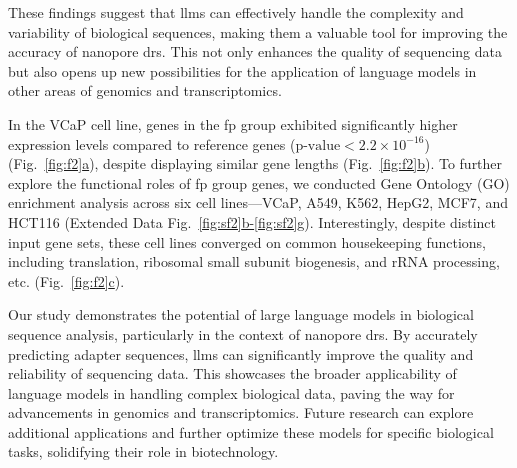 \documentclass[pdflatex, sn-mathphys-num, lineno]{sn-jnl}%
\newcommand{\figref}[2]{Fig.~\hyperref[#1]{\ref*{#1}#2}}
\newcommand{\edfigrefrg}[3]{Extended Data Fig.~\hyperref[#1]{\ref*{#1}#2-\ref*{#1}#3}}
\theoremstyle{thmstyleone}%
\theoremstyle{thmstyletwo}%
\theoremstyle{thmstylethree}%
\begin{document}
These findings suggest that \glspl{llm} can effectively handle the complexity and variability of biological sequences, making them a valuable tool for improving the accuracy of nanopore \gls{drs}.
This not only enhances the quality of sequencing data but also opens up new possibilities for the application of language models in other areas of genomics and transcriptomics.


In the VCaP cell line, genes in the \gls{fp} group exhibited significantly higher expression levels compared to reference genes (\(\textrm{p-value} < 2.2 \times 10^{-16}\)) (\figref{fig:f2}{a}), despite displaying similar gene lengths (\figref{fig:f2}{b}).
To further explore the functional roles of \gls{fp} group genes, we conducted Gene Ontology (GO) enrichment analysis across six cell lines—VCaP, A549, K562, HepG2, MCF7, and HCT116 (\edfigrefrg{fig:sf2}{b}{g}).
Interestingly, despite distinct input gene sets, these cell lines converged on common housekeeping functions, including translation, ribosomal small subunit biogenesis, and rRNA processing, etc. (\figref{fig:f2}{c}).



Our study demonstrates the potential of large language models in biological sequence analysis, particularly in the context of nanopore \gls{drs}.
By accurately predicting adapter sequences,  \glspl{llm} can significantly improve the quality and reliability of sequencing data.
This showcases the broader applicability of language models in handling complex biological data, paving the way for advancements in genomics and transcriptomics.
Future research can explore additional applications and further optimize these models for specific biological tasks, solidifying their role in biotechnology.
\end{document}
